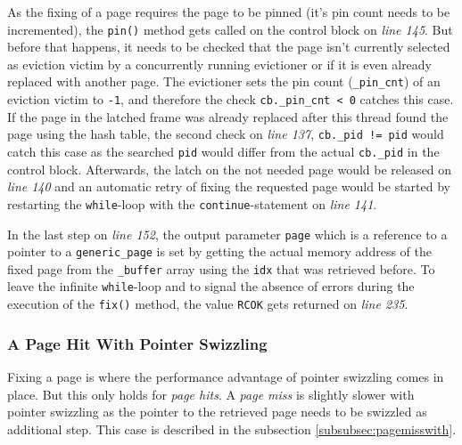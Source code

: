 	As the fixing of a page requires the page to be pinned (it's pin count needs to be incremented), the \lstinline{pin()} method gets called on the control block on \emph{line 145}. But before that happens, it needs to be checked that the page isn't currently selected as eviction victim by a concurrently running evictioner or if it is even already replaced with another page. The evictioner sets the pin count (\lstinline{_pin_cnt}) of an eviction victim to \lstinline{-1}, and therefore the check \lstinline{cb._pin_cnt < 0} catches this case. If the page in the latched frame was already replaced after this thread found the page using the hash table, the second check on \emph{line 137}, \lstinline{cb._pid != pid} would catch this case as the searched \lstinline{pid} would differ from the actual \lstinline{cb._pid} in the control block. Afterwards, the latch on the not needed page would be released on \emph{line 140} and an automatic retry of fixing the requested page would be started by restarting the \lstinline{while}-loop with the \lstinline{continue}-statement on \emph{line 141}.

	In the last step on \emph{line 152}, the output parameter \lstinline{page} which is a reference to a pointer to a \lstinline{generic_page} is set by getting the actual memory address of the fixed page from the \lstinline{_buffer} array using the \lstinline{idx} that was retrieved before. To leave the infinite \lstinline{while}-loop and to signal the absence of errors during the execution of the \lstinline{fix()} method, the value \lstinline{RCOK} gets returned on \emph{line 235}.

\subsubsection{A Page Hit With Pointer Swizzling} \label{subsubsec:pagehitwith}

	Fixing a page is where the performance advantage of pointer swizzling comes in place. But this only holds for \emph{page hits}. A \emph{page miss} is slightly slower with pointer swizzling as the pointer to the retrieved page needs to be swizzled as additional step. This case is described in the subsection \ref{subsubsec:pagemisswith}.

\begin{@empty}
	\lstset{
		language = [ISO]C++,
		style = basic
	}
	\begin{code}[ht!]
		\caption{Implementation of \lstinline{bf_tree_m::fix()} in case of a page hit with having a swizzled page identifier} \label{lst:fixswizzlehit}
		
	\end{code}
\end{@empty}	

